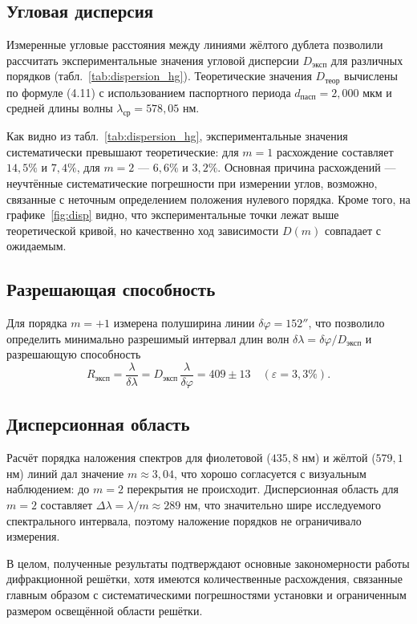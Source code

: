 \documentclass[a4paper]{article}
\begin{document}
\subsection{Угловая дисперсия}
Измеренные угловые расстояния между линиями жёлтого дублета позволили рассчитать экспериментальные значения угловой дисперсии $D_\text{эксп}$ для различных порядков (табл.~\ref{tab:dispersion_hg}). Теоретические значения $D_\text{теор}$ вычислены по формуле (4.11) с использованием паспортного периода $d_\text{пасп}=2{,}000$ мкм и средней длины волны $\lambda_\text{ср}=578{,}05$ нм.

Как видно из табл.~\ref{tab:dispersion_hg}, экспериментальные значения систематически превышают теоретические: для $m=1$ расхождение составляет $14{,}5\%$ и $7{,}4\%$, для $m=2$ — $6{,}6\%$ и $3{,}2\%$. Основная причина расхождений — неучтённые систематические погрешности при измерении углов, возможно, связанные с неточным определением положения нулевого порядка. Кроме того, на графике~\ref{fig:disp} видно, что экспериментальные точки лежат выше теоретической кривой, но качественно ход зависимости $D(m)$ совпадает с ожидаемым.

\subsection{Разрешающая способность}
Для порядка $m=+1$ измерена полуширина линии $\delta\varphi = 152''$, что позволило определить минимально разрешимый интервал длин волн $\delta\lambda = \delta\varphi / D_\text{эксп}$ и разрешающую способность
\[
R_\text{эксп} = \frac{\lambda}{\delta\lambda} = D_\text{эксп}\,\frac{\lambda}{\delta\varphi} = 409 \pm 13 \quad (\varepsilon = 3{,}3\%).
\]

\subsection{Дисперсионная область}
Расчёт порядка наложения спектров для фиолетовой ($435{,}8$ нм) и жёлтой ($579{,}1$ нм) линий дал значение $m \approx 3{,}04$, что хорошо согласуется с визуальным наблюдением: до $m=2$ перекрытия не происходит. Дисперсионная область для $m=2$ составляет $\Delta\lambda = \lambda/m \approx 289$ нм, что значительно шире исследуемого спектрального интервала, поэтому наложение порядков не ограничивало измерения.

В целом, полученные результаты подтверждают основные закономерности работы дифракционной решётки, хотя имеются количественные расхождения, связанные главным образом с систематическими погрешностями установки и ограниченным размером освещённой области решётки.
\end{document}
